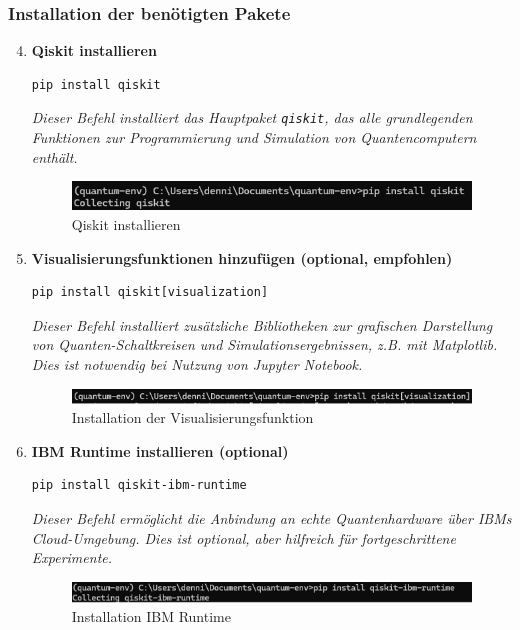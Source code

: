 \subsubsection*{Installation der benötigten Pakete}

\begin{enumerate}
    \setcounter{enumi}{3} %
    \item \textbf{Qiskit installieren}
    \begin{verbatim}
pip install qiskit
    \end{verbatim}
\textit{Dieser Befehl installiert das Hauptpaket \texttt{qiskit}, das alle grundlegenden Funktionen zur Programmierung und Simulation von Quantencomputern enthält. }
    \begin{figure}
        \centering
        \includegraphics[width=1\linewidth]{Qiskit installieren.png}
        \caption{Qiskit installieren}
        \label{fig:enter-label}
    \end{figure}

    \item \textbf{Visualisierungsfunktionen hinzufügen (optional, empfohlen)}
    \begin{verbatim}
pip install qiskit[visualization]
    \end{verbatim}
\textit{Dieser Befehl installiert zusätzliche Bibliotheken zur grafischen Darstellung von Quanten-Schaltkreisen und Simulationsergebnissen, z.B. mit Matplotlib.  Dies ist notwendig bei Nutzung von Jupyter Notebook. }
    \begin{figure}
        \centering
        \includegraphics[width=1\linewidth]{Installation der Visualisierungsfunktion.png}
        \caption{Installation der Visualisierungsfunktion}
        \label{fig:enter-label}
    \end{figure}

    \item \textbf{IBM Runtime installieren (optional)}
    \begin{verbatim}
pip install qiskit-ibm-runtime
    \end{verbatim}
\textit{Dieser Befehl ermöglicht die Anbindung an echte Quantenhardware über IBMs Cloud-Umgebung.  Dies ist optional, aber hilfreich für fortgeschrittene Experimente. }
    \begin{figure}
        \centering
        \includegraphics[width=1\linewidth]{Installation IBM Runtime.png}
        \caption{Installation IBM Runtime}
        \label{fig:enter-label}
    \end{figure}
\end{enumerate}

